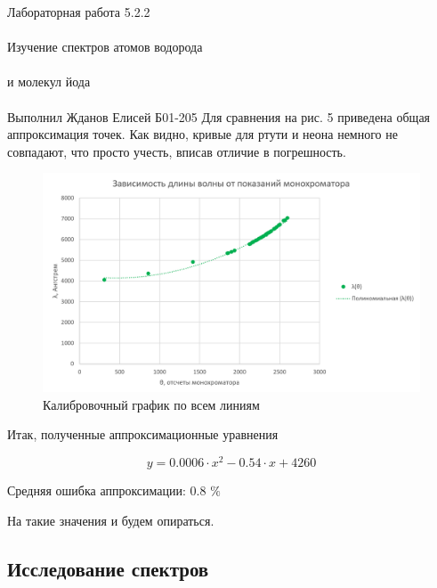 \documentclass{astroedu-lab}
\begin{document}
\begin{problem}{\huge Лабораторная работа 5.2.2\\\\Изучение спектров атомов водорода\\\\и молекул йода\\\\Выполнил Жданов Елисей Б01-205}
	Для сравнения на рис. 5 приведена общая аппроксимация точек. Как видно, кривые для ртути и неона немного не совпадают, что просто учесть, вписав отличие в погрешность.
	
	\begin{figure}[!h]
		\centering
		\includegraphics[width=0.9\linewidth]{int}
		\caption{Калибровочный график по всем линиям}
		\label{fig:graph2}
	\end{figure}
	
Итак, полученные аппроксимационные уравнения


\[
y=0.0006 \cdot x^2 - 0.54 \cdot x + 4260
\]

Средняя ошибка аппроксимации: 0.8 $\%$

На такие значения и будем опираться.

\newpage
	
\subsection{Исследование спектров}
	

\end{problem}
\end{document}
